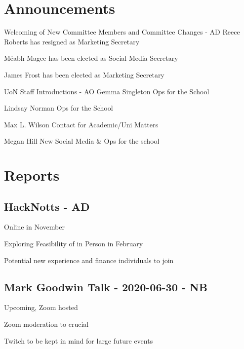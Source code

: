 \documentclass[11pt]{meetingmins}
\begin{document}
\maketitle

\section{Announcements }
\begin{items}
  \item
  Welcoming of New Committee Members and Committee Changes - AD
    \subitem
    Reece Roberts has resigned as Marketing Secretary

    \subitem
    M\'eabh Magee has been elected as Social Media Secretary

    \subitem
    James Frost has been elected as Marketing Secretary

  \item
  UoN Staff Introductions - AO
    \subitem
    Gemma Singleton
      \subsubitem
      Ops for the School

    \subitem
    Lindsay Norman
      \subsubitem
      Ops for the School

    \subitem
    Max L. Wilson
      \subsubitem
      Contact for Academic/Uni Matters

    \subitem
    Megan Hill 
      \subsubitem
      New Social Media \& Ops for the school
\end{items}

\section{Reports}

\subsection{HackNotts - AD}
\begin{hiddensubitems}
  \item 
  Online in November
  \item 
  Exploring Feasibility of in Person in February
  \item 
  Potential new experience and finance individuals to join
\end{hiddensubitems}

\subsection{Mark Goodwin Talk - 2020-06-30 - NB}
\begin{hiddensubitems}
  \item 
  Upcoming, Zoom hosted
  \item 
  Zoom moderation to crucial
  \item 
  Twitch to be kept in mind for large future events
\end{hiddensubitems}
\end{document}
